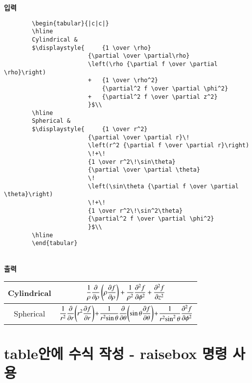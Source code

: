 	\singlespacing
	\textbf{입력}\\
		\begin{boxedminipage}[t]{1.0\linewidth}
		\small
		\begin{verbatim}	
		\begin{tabular}{|c|c|}
		\hline
		Cylindrical & 
		$\displaystyle{ 	{1 \over \rho}
						{\partial \over \partial\rho}
						\left(\rho {\partial f \over \partial \rho}\right)
						+ 	{1 \over \rho^2}
							{\partial^2 f \over \partial \phi^2}  
						+ 	{\partial^2 f \over \partial z^2}
						}$\\
		\hline
		Spherical & 
		$\displaystyle{ 	{1 \over r^2}
						{\partial \over \partial r}\!
						\left(r^2 {\partial f \over \partial r}\right)
						\!+\!
						{1 \over r^2\!\sin\theta}
						{\partial \over \partial \theta}
						\!
						\left(\sin\theta {\partial f \over \partial \theta}\right)
						\!+\!
						{1 \over r^2\!\sin^2\theta}
						{\partial^2 f \over \partial \phi^2}
						}$\\
		\hline
		\end{tabular}
		\end{verbatim} 
		\end{boxedminipage} \\

		\textbf{출력}\\
		
	\doublespacing

		\begin{tabular}{|c|c|}
		\hline
		Cylindrical & 
		$\displaystyle{ 	{1 \over \rho}
						{\partial \over \partial\rho}
						\left(\rho {\partial f \over \partial \rho}\right)
						+ 	{1 \over \rho^2}
							{\partial^2 f \over \partial \phi^2}  
						+ 	{\partial^2 f \over \partial z^2}
						}$\\
		\hline
		Spherical & 
		$\displaystyle{ 	{1 \over r^2}
						{\partial \over \partial r}\!
						\left(r^2 {\partial f \over \partial r}\right)
						\!+\!
						{1 \over r^2\!\sin\theta}
						{\partial \over \partial \theta}
						\!
						\left(\sin\theta {\partial f \over \partial \theta}\right)
						\!+\!
						{1 \over r^2\!\sin^2\theta}
						{\partial^2 f \over \partial \phi^2}
						}$\\
		\hline
		\end{tabular}
		
\newpage
\section{table안에 수식 작성 - raisebox 명령 사용 }
\null
		
